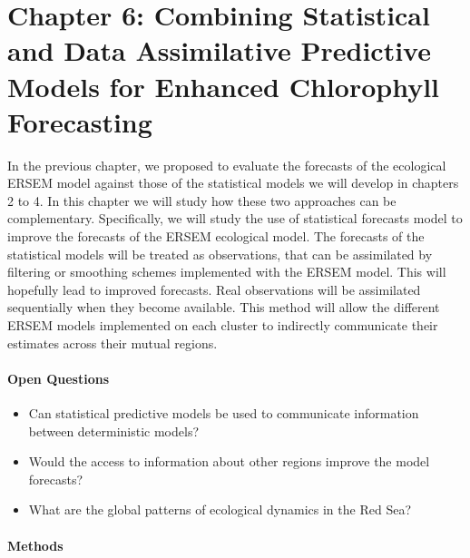 \section{Chapter 6: Combining Statistical and Data Assimilative Predictive
Models for Enhanced Chlorophyll Forecasting}

In the previous chapter, we proposed to evaluate the forecasts of the
ecological ERSEM model against those of the statistical models we will develop in
chapters 2 to 4. In this chapter we will study how these two approaches can be
complementary. Specifically, we will study the use of statistical forecasts
model to improve the forecasts of the ERSEM ecological model. The forecasts of
the statistical models will be treated as observations, that can be assimilated
by filtering or smoothing schemes implemented with the ERSEM model. This will
hopefully lead to improved forecasts. Real observations will be assimilated
sequentially when they become available. This method will allow the different
ERSEM models implemented on each cluster to indirectly communicate their
estimates across their mutual regions.

\paragraph{Open Questions}

\begin{itemize}

\item Can statistical predictive models be used to communicate information
between deterministic models?

\item Would the access to information about other regions improve the model
forecasts?

\item What are the global patterns of ecological dynamics in the Red Sea?

\end{itemize}

\paragraph{Methods}

